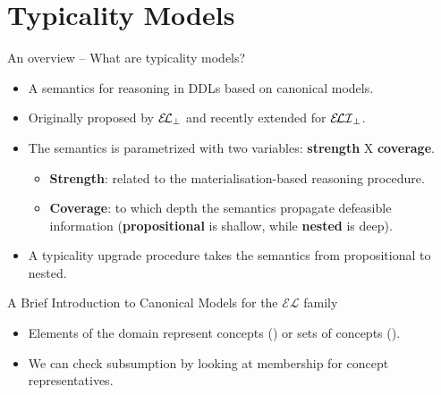 \documentclass[10pt]{beamer}
\begin{document}
\section{Typicality Models}

\begin{frame}[fragile]{An overview -- What are typicality models?}

\begin{itemize}
  \item A semantics for reasoning in DDLs based on canonical models. \pause
  \item Originally proposed by $\mathcal{E\!L}_\bot$ and recently extended for $\mathcal{E\!LI}_\bot$. \pause
  \item The semantics is parametrized with two variables: \textbf{strength} X \textbf{coverage}.
  \begin{itemize}
    \item \textbf{Strength}: related to the materialisation-based reasoning procedure.
    \item \textbf{Coverage}: to which depth the semantics propagate defeasible information (\textbf{propositional} is shallow, while \textbf{nested} is deep).
  \end{itemize}\pause
  \item A typicality upgrade procedure takes the semantics from propositional to nested.
\end{itemize}

\end{frame}

\begin{frame}[fragile]{A Brief Introduction to Canonical Models for the  $\mathcal{EL}$ family}

\large{
  \begin{itemize}
    \item Elements of the domain represent concepts (\ELbot) or sets of concepts (\ELIbot). \pause
    \item We can check subsumption by looking at membership for concept representatives.
  \end{itemize}
}

\end{frame}
\end{document}
